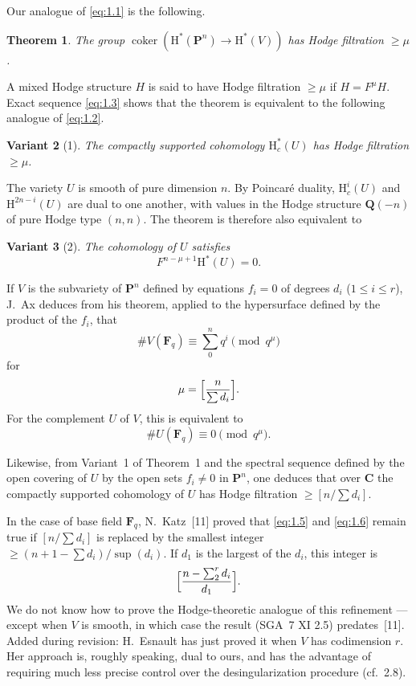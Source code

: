 \documentclass[11pt]{amsart}
\newtheorem{theorem}{Theorem}
\newtheorem{variant}[theorem]{Variant}
\theoremstyle{definition}
\DeclareMathOperator{\Coker}{coker}
\begin{document}
Our analogue of \eqref{eq:1.1} is the following.

\begin{theorem}
The group $\Coker(\mathrm H^*(\mathbf P^n)\to \mathrm H^*(V))$ has Hodge filtration $\ge \mu$.
\end{theorem}

A mixed Hodge structure $H$ is said to have Hodge filtration $\ge \mu$ if $H = F^\mu H$. Exact sequence \eqref{eq:1.3} shows that the theorem is equivalent to the following analogue of \eqref{eq:1.2}.

\begin{variant}[1]
The compactly supported cohomology $\mathrm H_c^*(U)$ has Hodge filtration $\ge \mu$.
\end{variant}

The variety $U$ is smooth of pure dimension $n$. By Poincar\'e duality, $\mathrm H_c^i(U)$ and $\mathrm H^{2n-i}(U)$ are dual to one another, with values in the Hodge structure $\mathbf Q(-n)$ of pure Hodge type $(n,n)$. The theorem is therefore also equivalent to

\begin{variant}[2]
The cohomology of $U$ satisfies
\begin{equation}\label{eq:1.4}
F^{n-\mu+1}\mathrm H^*(U)=0.
\tag{1.4}
\end{equation}
\end{variant}

If $V$ is the subvariety of $\mathbf P^n$ defined by equations $f_i=0$ of degrees $d_i$ ($1\le i\le r$), J.~Ax deduces from his theorem, applied to the hypersurface defined by the product of the $f_i$, that
\begin{equation}\label{eq:1.5}
\# V(\mathbf F_q) \equiv \sum_0^n q^i \pmod{q^\mu}
\tag{1.5}
\end{equation}
for
\[
\mu = \Bigl[\frac{n}{\sum d_i}\Bigr].
\]
For the complement $U$ of $V$, this is equivalent to
\begin{equation}\label{eq:1.6}
\# U(\mathbf F_q) \equiv 0 \pmod{q^\mu}.
\tag{1.6}
\end{equation}

Likewise, from Variant~1 of Theorem~1 and the spectral sequence defined by the open covering of $U$ by the open sets $f_i\neq 0$ in $\mathbf P^n$, one deduces that over $\mathbf C$ the compactly supported cohomology of $U$ has Hodge filtration $\ge [n/\sum d_i]$.

In the case of base field $\mathbf F_q$, N.~Katz~[11] proved that \eqref{eq:1.5} and \eqref{eq:1.6} remain true if $[n/\sum d_i]$ is replaced by the smallest integer $\ge (n+1-\sum d_i)/\sup(d_i)$. If $d_1$ is the largest of the $d_i$, this integer is
\[
\Bigl[\frac{n-\sum_2^r d_i}{d_1}\Bigr].
\]
We do not know how to prove the Hodge-theoretic analogue of this refinement --- except when $V$ is smooth, in which case the result (SGA~7 XI 2.5) predates~[11]. Added during revision: H.~Esnault has just proved it when $V$ has codimension $r$. Her approach is, roughly speaking, dual to ours, and has the advantage of requiring much less precise control over the desingularization procedure (cf.~2.8).
\end{document}
